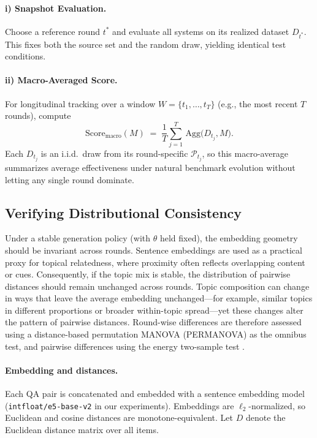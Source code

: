 \paragraph{i) Snapshot Evaluation.}
Choose a reference round $t^\ast$ and evaluate all systems on its realized dataset $D_{t^\ast}$. This fixes both the source set and the random draw, yielding identical test conditions.

\paragraph{ii) Macro-Averaged Score.}
For longitudinal tracking over a window $W=\{t_1,\ldots,t_T\}$ (e.g., the most recent $T$ rounds), compute
\begin{equation}
    \text{Score}_{\text{macro}}(M) \;=\; \frac{1}{T}\sum_{j=1}^{T}\,\text{Agg}\!\big(D_{t_j}, M\big).
\end{equation}
Each $D_{t_j}$ is an i.i.d.\ draw from its round-specific $\mathcal{P}_{t_j}$, so this macro-average summarizes average effectiveness under natural benchmark evolution without letting any single round dominate.



\subsection{Verifying Distributional Consistency}
\label{subsec:consistency-method}

Under a stable generation policy (with $\theta$ held fixed), the embedding geometry should be invariant across rounds. Sentence embeddings are used as a practical proxy for topical relatedness, where proximity often reflects overlapping content or cues. Consequently, if the topic mix is stable, the distribution of pairwise distances should remain unchanged across rounds. Topic composition can change in ways that leave the average embedding unchanged—for example, similar topics in different proportions or broader within-topic spread—yet these changes alter the pattern of pairwise distances. Round-wise differences are therefore assessed using a distance-based permutation MANOVA (PERMANOVA) \cite{andersonNewMethodNonparametric2001} as the omnibus test, and pairwise differences using the energy two-sample test \cite{szekelyEnergyStatisticsClass2013}.

\paragraph{Embedding and distances.}
Each QA pair is concatenated and embedded with a sentence embedding model (\texttt{intfloat/e5-base-v2} \cite{wangTextEmbeddingsWeaklySupervised2024} in our experiments). Embeddings are $\ell_2$-normalized, so Euclidean and cosine distances are monotone-equivalent. Let $D$ denote the Euclidean distance matrix over all items.

